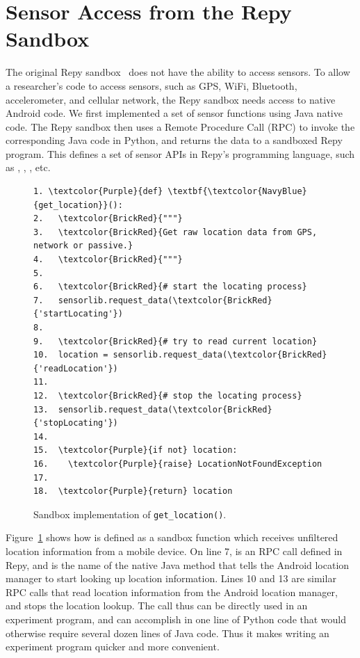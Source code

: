 \section{Sensor Access from the Repy Sandbox}\label{sec-sensor}

The original Repy sandbox~\cite{cappos2010retaining} does not have 
the ability to access sensors.
To allow a researcher's code to access sensors, such as 
GPS, WiFi, Bluetooth, accelerometer, and cellular network, the Repy  
sandbox needs access to native Android code. 
We first implemented a set of sensor 
functions using Java native code. 
The Repy sandbox then uses a Remote Procedure Call (RPC) to invoke the
corresponding Java code in Python, and returns the data 
to a sandboxed Repy program. This defines a set of sensor APIs in 
Repy's programming language, such as , 
, , etc. 

\begin{figure}
\begin{Verbatim}
1. \textcolor{Purple}{def} \textbf{\textcolor{NavyBlue}{get_location}}():
2.   \textcolor{BrickRed}{"""}
3.   \textcolor{BrickRed}{Get raw location data from GPS, network or passive.}
4.   \textcolor{BrickRed}{"""}
5. 
6.   \textcolor{BrickRed}{# start the locating process} 
7.   sensorlib.request_data(\textcolor{BrickRed}{'startLocating'})
8.
9.   \textcolor{BrickRed}{# try to read current location}
10.  location = sensorlib.request_data(\textcolor{BrickRed}{'readLocation'})
11.
12.  \textcolor{BrickRed}{# stop the locating process} 
13.  sensorlib.request_data(\textcolor{BrickRed}{'stopLocating'})
14.
15.  \textcolor{Purple}{if not} location:
16.    \textcolor{Purple}{raise} LocationNotFoundException    
17.  
18.  \textcolor{Purple}{return} location
\end{Verbatim}
\caption{\small Sandbox implementation of \texttt{get\_location()}. 
\label{fig-getlocation}}
\end{figure}

Figure~\ref{fig-getlocation} shows how  
is defined as a sandbox function which receives unfiltered location 
information from a mobile device. 
On line 7,  is an RPC call 
defined in Repy, 
and  is the name of the native Java method that tells the Android 
location manager to start looking up location information. Lines 10 and 13 are similar RPC 
calls that read location information from the Android location manager, and stops the location 
lookup. The call  thus %
can be directly used in an experiment program, and can 
accomplish in one line of Python code that would otherwise require several dozen 
lines of Java code. Thus it makes writing an experiment program quicker and more convenient.

